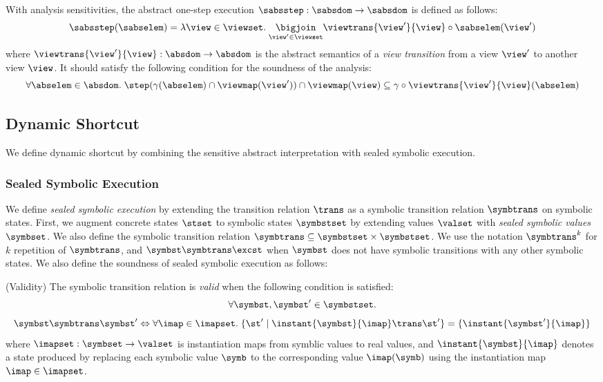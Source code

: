 With analysis sensitivities, the abstract one-step execution $\sabsstep:
\sabsdom \rightarrow \sabsdom$ is defined as follows:
\[
  \sabsstep(\sabselem) = \lambda \view \in \viewset. \; \underset{\view' \in
  \viewset}{\bigjoin}{\viewtrans{\view'}{\view} \circ \sabselem(\view')}
\]
where $\viewtrans{\view'}{\view}: \absdom \rightarrow \absdom$ is the abstract
semantics of a \textit{view transition} from a view $\view'$ to another view
$\view$.  It should satisfy the following condition for the soundness of the
analysis:
\[
  \forall \abselem \in \absdom. \; \step(\gamma(\abselem) \cap \viewmap(\view'))
  \cap \viewmap(\view) \subseteq \gamma \circ
  \viewtrans{\view'}{\view}(\abselem)
\]



\subsection{Dynamic Shortcut}

We define dynamic shortcut by combining the sensitive abstract interpretation
with sealed symbolic execution.


\subsubsection{Sealed Symbolic Execution}

We define \textit{sealed symbolic execution} by extending the transition
relation $\trans$ as a symbolic transition relation $\symbtrans$ on symbolic
states.  First, we augment concrete states $\stset$ to symbolic states
$\symbstset$ by extending values $\valset$ with \textit{sealed symbolic values}
$\symbset$.  We also define the symbolic transition relation $\symbtrans
\subseteq \symbstset \times \symbstset$. We use the notation $\symbtrans^k$
for $k$ repetition of $\symbtrans$, and  $\symbst \symbtrans \excst$ when
$\symbst$ does not have symbolic transitions with any other symbolic states.  We
also define the soundness of sealed symbolic execution as follows:
\begin{definition}{(Validity)}
  The symbolic transition relation is \textit{valid} when the following
  condition is satisfied:
  \[
      \forall \symbst, \symbst' \in \symbstset.\\
  \]
  \[
    \symbst \symbtrans \symbst' \Leftrightarrow
    \forall \imap \in \imapset. \;
    \{ \st' \mid \instant{\symbst}{\imap} \trans \st' \}
    = \{ \instant{\symbst'}{\imap} \}
  \]
  where $\imapset: \symbset \rightarrow \valset$ is instantiation maps from
  symblic values to real values, and $\instant{\symbst}{\imap}$ denotes a state
  produced by replacing each symbolic value $\symb$ to the corresponding value
  $\imap(\symb)$ using the instantiation map $\imap \in \imapset$.
\end{definition}

